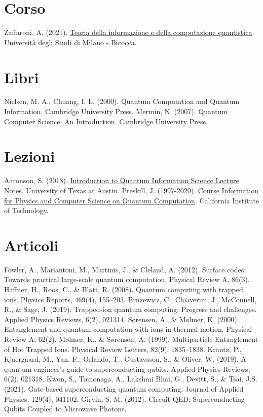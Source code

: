 \begin{thebibliography}{12}
\section*{Corso}
Zaffaroni, A. (2021). \href{https://elearning.unimib.it/course/view.php?id=39146}{Teoria della informazione e della computazione quantistica}. Università degli Studi di Milano - Bicocca.
\section*{Libri}
Nielsen, M. A., Chuang, I. L. (2000). Quantum Computation and Quantum Information. Cambridge University Press.
Mermin, N. (2007). Quantum Computer Science: An Introduction. Cambridge University Press.
\section*{Lezioni}
Aaronson, S. (2018). \href{https://www.scottaaronson.com/qclec.pdf}{Introduction to Quantum Information Science Lecture Notes}. University of Texas at Austin.
Preskill, J. (1997-2020). \href{http://theory.caltech.edu/~preskill/ph219/}{Course Information for Physics and Computer Science on Quantum Computation}. California Institute of Technology.
\section*{Articoli}
Fowler, A., Mariantoni, M., Martinis, J., \& Cleland, A. (2012). Surface codes: Towards practical large-scale quantum computation. Physical Review A, 86(3).
Haffner, H., Roos, C., \& Blatt, R. (2008). Quantum computing with trapped ions. Physics Reports, 469(4), 155–203.
Bruzewicz, C., Chiaverini, J., McConnell, R., \& Sage, J. (2019). Trapped-ion quantum computing: Progress and challenges. Applied Physics Reviews, 6(2), 021314.
Sørensen, A., \& Mølmer, K. (2000). Entanglement and quantum computation with ions in thermal motion. Physical Review A, 62(2).
Mølmer, K., \& Sørensen, A. (1999). Multiparticle Entanglement of Hot Trapped Ions. Physical Review Letters, 82(9), 1835–1838.
Krantz, P., Kjaergaard, M., Yan, F., Orlando, T., Gustavsson, S., \& Oliver, W. (2019). A quantum engineer’s guide to superconducting qubits. Applied Physics Reviews, 6(2), 021318.
Kwon, S., Tomonaga, A., Lakshmi Bhai, G., Devitt, S., \& Tsai, J.S. (2021). Gate-based superconducting quantum computing. Journal of Applied Physics, 129(4), 041102.
Girvin, S. M. (2012). Circuit QED: Superconducting Qubits Coupled to Microwave Photons.
\end{thebibliography}